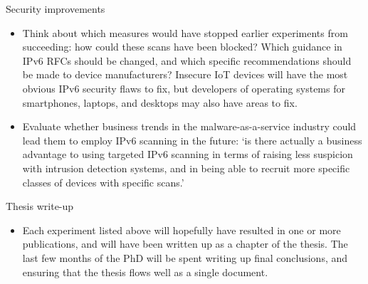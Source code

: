 \documentclass[10pt,sigconf]{acmart}
\begin{document}
Security improvements
\begin{itemize}
	\item Think about which measures would have stopped earlier experiments from succeeding:
	how could these scans have been blocked?
	Which guidance in IPv6 RFCs should be changed, and which specific recommendations should be made to device manufacturers?
	Insecure IoT devices will have the most obvious IPv6 security flaws to fix, but developers of operating systems for smartphones, laptops, and desktops may also have areas to fix.
	\item Evaluate whether business trends in the malware-as-a-service industry could lead them to employ IPv6 scanning in the future:
	`is there actually a business advantage to using targeted IPv6 scanning in terms of raising less suspicion with intrusion detection systems, and in being able to recruit more specific classes of devices with specific scans.'
\end{itemize}

Thesis write-up
\begin{itemize}
	\item Each experiment listed above will hopefully have resulted in one or more publications, and will have been written up as a chapter of the thesis.
	The last few months of the PhD will be spent writing up final conclusions, and ensuring that the thesis flows well as a single document.
\end{itemize}


%





\ifpdf
  \ifdefined\pdftrailerid
    \pdftrailerid{}
  \fi
\fi
\end{document}
